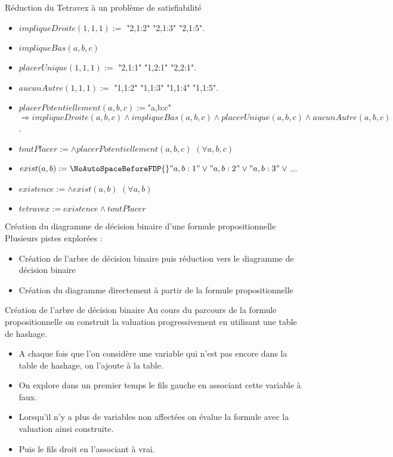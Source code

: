 \documentclass{beamer}
\begin{document}
\begin{frame}{Réduction du Tetravex à un problème de satisfiabilité}

{\small

    \begin{itemize}
        \item $impliqueDroite(1, 1, 1) :=$ {\NoAutoSpaceBeforeFDP{}"2,1:2" \lor{} "2,1:3" \lor{} "2,1:5"}.
        \item $impliqueBas(a, b, c)$
        \item $placerUnique(1, 1, 1) :=$ {\NoAutoSpaceBeforeFDP{} \neg "2,1:1" \land{} \neg "1,2:1" \land{} \neg "2,2:1"}.
        \item $aucunAutre(1, 1, 1) :=$ {\NoAutoSpaceBeforeFDP{} \neg "1,1:2" \land{} \neg "1,1:3" \land{} \neg "1,1:4" \land{} \neg "1,1:5"}.
        \item $placerPotentiellement(a, b, c) := ${\NoAutoSpaceBeforeFDP{}"a,b:c"}$ \Rightarrow{} impliqueDroite(a, b, c) \land{} impliqueBas(a, b, c) \land{} placerUnique(a, b, c) \land{} aucunAutre(a, b, c)$.
        \item $toutPlacer := \land{} placerPotentiellement(a, b, c)$ $(\forall{} a, b, c)$
        \item $exist(a, b) := {\NoAutoSpaceBeforeFDP{}"a,b:1" \lor{} "a,b:2" \lor{} "a,b:3" \lor{}}$...
        \item $existence := \land{} exist(a, b)$ $(\forall{} a, b)$
        \item $tetravex := existence \land{} toutPlacer$
    \end{itemize}
}

\end{frame}


\begin{frame}{Création du diagramme de décision binaire d'une formule propositionnelle}
Plusieurs pistes explorées :
\begin{itemize}
\item Création de l'arbre de décision binaire puis réduction vers le diagramme de décision binaire
\item Création du diagramme directement à partir de la formule propositionnelle
\end{itemize}
\end{frame}

\begin{frame}{Création de l'arbre de décision binaire}
Au cours du parcours de la formule propositionnelle on construit la valuation progressivement en utilisant une table de hashage. 
\begin{itemize}
\item A chaque fois que l'on considère une variable qui n'est pas encore dans la table de hashage, on l'ajoute à la table.
\item On explore dans un premier temps le fils gauche en associant cette variable à faux.
\item Lorsqu'il n'y a plus de variables non affectées on évalue la formule avec la valuation ainsi construite.
\item Puis le fils droit en l'associant à vrai.
\end{itemize}
\end{frame}
\end{document}
